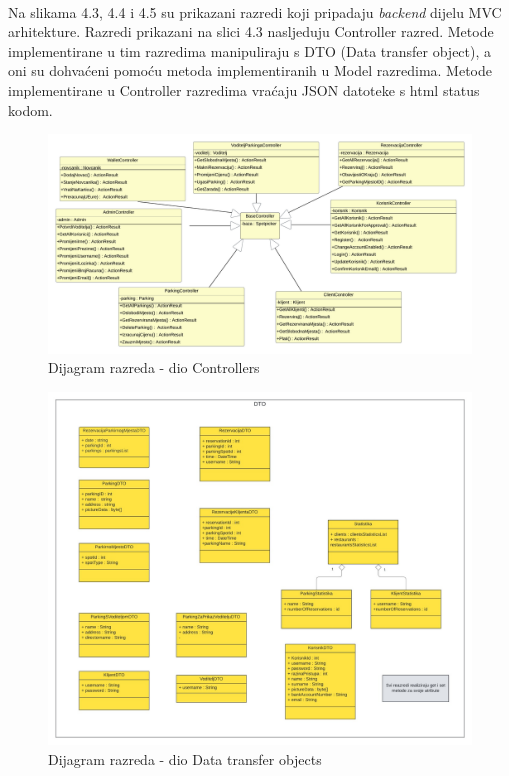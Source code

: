 \paragraph{}
{Na slikama 4.3, 4.4 i 4.5 su prikazani razredi koji pripadaju \emph{backend} dijelu MVC
	arhitekture. Razredi prikazani na slici 4.3 nasljeduju Controller razred. Metode implementirane u tim razredima manipuliraju s DTO (Data transfer object), a oni su dohvaćeni pomoću metoda implementiranih u Model razredima. Metode implementirane u Controller razredima vraćaju JSON datoteke s html status kodom.
}
\vfill
\begin{figure}[!htb]
	\centering
	\includegraphics[width=1\linewidth]{dijagrami/ControllersDiagram.png}
	\caption{Dijagram razreda - dio Controllers}
	\label{fig:controllersdiagram}
	\vfill
\end{figure}

\begin{figure}[!htb]
	\centering
	\includegraphics[width=1\linewidth]{dijagrami/DTODijagram.jpg}
	\caption{Dijagram razreda - dio Data transfer objects}
	\label{fig:dtodiagram}
	\vfill
\end{figure}

